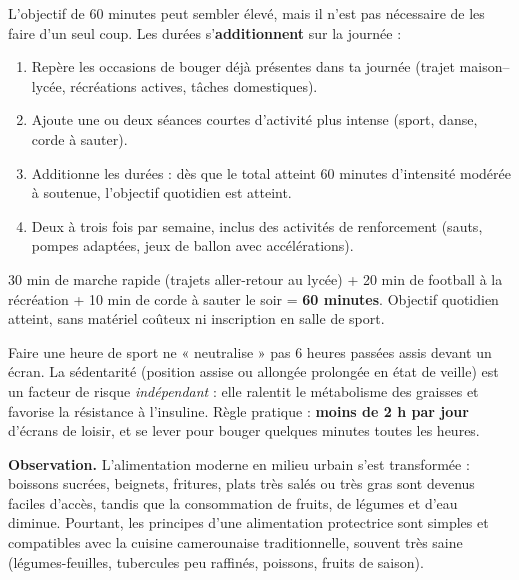 \documentclass[11pt]{article}
\newcommand{\cle}[1]{{\popxbold\color{popdark}#1}}
\newcounter{popsec}
\newcounter{popsub}
\newcommand{\courssub}[1]{%
  \stepcounter{popsub}%
  \par\vspace{9pt}\noindent{\popxbold\fontsize{11.5}{13}\selectfont\color{popink}{\color{poporange}\thepopsec.\thepopsub}\hspace{6pt}#1}\par\nopagebreak\vspace{4pt}
}
\begin{document}
\begin{methode}
L'objectif de 60 minutes peut sembler élevé, mais il n'est pas nécessaire de les faire d'un seul coup. Les durées s'\textbf{additionnent} sur la journée :
\begin{enumerate}
\item Repère les occasions de bouger déjà présentes dans ta journée (trajet maison--lycée, récréations actives, tâches domestiques).
\item Ajoute une ou deux séances courtes d'activité plus intense (sport, danse, corde à sauter).
\item Additionne les durées : dès que le total atteint 60 minutes d'intensité modérée à soutenue, l'objectif quotidien est atteint.
\item Deux à trois fois par semaine, inclus des activités de renforcement (sauts, pompes adaptées, jeux de ballon avec accélérations).
\end{enumerate}
\end{methode}

\begin{exemplebox}
30 min de marche rapide (trajets aller-retour au lycée) + 20 min de football à la récréation + 10 min de corde à sauter le soir = \textbf{60 minutes}. Objectif quotidien atteint, sans matériel coûteux ni inscription en salle de sport.
\end{exemplebox}

\begin{attention}
Faire une heure de sport ne « neutralise » pas 6 heures passées assis devant un écran. La \cle{sédentarité} (position assise ou allongée prolongée en état de veille) est un facteur de risque \emph{indépendant} : elle ralentit le métabolisme des graisses et favorise la résistance à l'insuline. Règle pratique : \textbf{moins de 2 h par jour} d'écrans de loisir, et se lever pour bouger quelques minutes toutes les heures.
\end{attention}

\courssub{Les recommandations alimentaires}

\textbf{Observation.} L'alimentation moderne en milieu urbain s'est transformée : boissons sucrées, beignets, fritures, plats très salés ou très gras sont devenus faciles d'accès, tandis que la consommation de fruits, de légumes et d'eau diminue. Pourtant, les principes d'une alimentation protectrice sont simples et compatibles avec la cuisine camerounaise traditionnelle, souvent très saine (légumes-feuilles, tubercules peu raffinés, poissons, fruits de saison).
\end{document}
